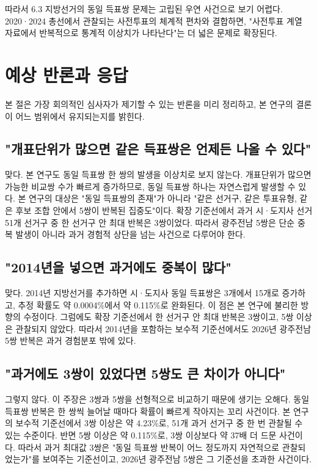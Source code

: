 \documentclass[preprint]{IEIE}
\begin{document}
따라서 6.3 지방선거의 동일 득표쌍 문제는 고립된 우연 사건으로 보기 어렵다. 2020·2024 총선에서 관찰되는 사전투표의 체계적 편차와 결합하면, "사전투표 계열 자료에서 반복적으로 통계적 이상치가 나타난다"는 더 넓은 문제로 확장된다.

\section{예상 반론과 응답}

본 절은 가장 회의적인 심사자가 제기할 수 있는 반론을 미리 정리하고, 본 연구의 결론이 어느 범위에서 유지되는지를 밝힌다.

\subsection{"개표단위가 많으면 같은 득표쌍은 언제든 나올 수 있다"}

맞다. 본 연구도 동일 득표쌍 한 쌍의 발생을 이상치로 보지 않는다. 개표단위가 많으면 가능한 비교쌍 수가 빠르게 증가하므로, 동일 득표쌍 하나는 자연스럽게 발생할 수 있다. 본 연구의 대상은 "동일 득표쌍의 존재"가 아니라 "같은 선거구, 같은 투표유형, 같은 후보 조합 안에서 5쌍이 반복된 집중도"이다. 확장 기준선에서 과거 시·도지사 선거 51개 선거구 중 한 선거구 안 최대 반복은 3쌍이었다. 따라서 광주전남 5쌍은 단순 중복 발생이 아니라 과거 경험적 상단을 넘는 사건으로 다루어야 한다.

\subsection{"2014년을 넣으면 과거에도 중복이 많다"}

맞다. 2014년 지방선거를 추가하면 시·도지사 동일 득표쌍은 3개에서 15개로 증가하고, 추정 확률도 약 0.0004\%에서 약 0.115\%로 완화된다. 이 점은 본 연구에 불리한 방향의 수정이다. 그럼에도 확장 기준선에서 한 선거구 안 최대 반복은 3쌍이고, 5쌍 이상은 관찰되지 않았다. 따라서 2014년을 포함하는 보수적 기준선에서도 2026년 광주전남 5쌍 반복은 과거 경험분포 밖에 있다.

\subsection{"과거에도 3쌍이 있었다면 5쌍도 큰 차이가 아니다"}

그렇지 않다. 이 주장은 3쌍과 5쌍을 선형적으로 비교하기 때문에 생기는 오해다. 동일 득표쌍 반복은 한 쌍씩 늘어날 때마다 확률이 빠르게 작아지는 꼬리 사건이다. 본 연구의 보수적 기준선에서 3쌍 이상은 약 4.23\%로, 51개 과거 선거구 중 한 번 관찰될 수 있는 수준이다. 반면 5쌍 이상은 약 0.115\%로, 3쌍 이상보다 약 37배 더 드문 사건이다. 따라서 과거 최대값 3쌍은 "동일 득표쌍 반복이 어느 정도까지 자연적으로 관찰되었는가"를 보여주는 기준선이고, 2026년 광주전남 5쌍은 그 기준선을 초과한 사건이다.
\end{document}
